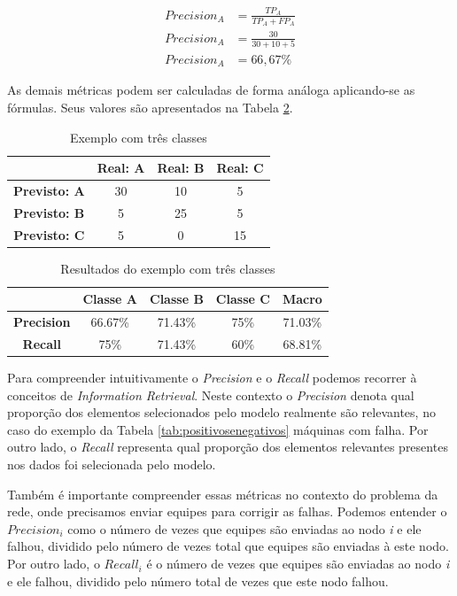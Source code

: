 \begin{align*}
Precision_A &= \frac{TP_A}{TP_A+FP_A} \\
Precision_A &= \frac{30}{30+10+5} \\
Precision_A &= 66,67\%
\end{align*}

As demais métricas podem ser calculadas de forma análoga aplicando-se as fórmulas.
Seus valores são apresentados na Tabela \ref{tab:resultados_exemplo2}.

\begin{table}[h!]
  \begin{center}
    \begin{tabular}{cccc}
      \hline
        & \textbf{Real: A} & \textbf{Real: B} & \textbf{Real: C}\\
      \hline

      \textbf{Previsto: A} & 30 & 10 & 5 \\
      \textbf{Previsto: B} & 5 & 25 & 5 \\
      \textbf{Previsto: C} & 5 & 0 & 15 \\

      \hline
    \end{tabular}
    \caption{Exemplo com três classes}
    \label{tab:positivosenegativos2}
  \end{center}
\end{table}

\begin{table}[h!]
  \begin{center}
    \begin{tabular}{ccccc}
      \hline
        & \textbf{Classe A} & \textbf{Classe B} & \textbf{Classe C} & \textbf{Macro}\\
      \hline

\textbf{Precision}	&	66.67\%	&	71.43\%	&	75\%	&	71.03\%	\\
\textbf{Recall}	&	75\%	&	71.43\%	&	60\%	&	68.81\%	\\

      \hline
    \end{tabular}
    \caption{Resultados do exemplo com três classes}
    \label{tab:resultados_exemplo2}
  \end{center}
\end{table}

Para compreender intuitivamente o \textit{Precision} e o \textit{Recall} podemos recorrer à conceitos de \textit{Information Retrieval}.
Neste contexto o \textit{Precision} denota qual proporção dos elementos selecionados pelo modelo realmente são relevantes, no caso do exemplo da Tabela \ref{tab:positivosenegativos} máquinas com falha.
Por outro lado, o \textit{Recall} representa qual proporção dos elementos relevantes presentes nos dados foi selecionada pelo modelo.

Também é importante compreender essas métricas no contexto do problema da rede, onde precisamos enviar equipes para corrigir as falhas.
Podemos entender o $Precision_i$ como o número de vezes que equipes são enviadas ao nodo \textit{i} e ele falhou, dividido pelo número de vezes total que equipes são enviadas à este nodo.
Por outro lado, o $Recall_i$ é o número de vezes que equipes são enviadas ao nodo \textit{i} e ele falhou, dividido pelo número total de vezes que este nodo falhou.

